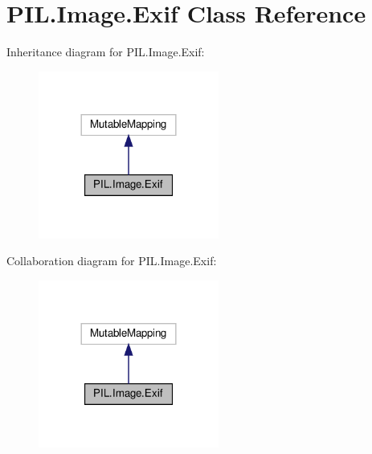 \hypertarget{classPIL_1_1Image_1_1Exif}{}\section{P\+I\+L.\+Image.\+Exif Class Reference}
\label{classPIL_1_1Image_1_1Exif}


Inheritance diagram for P\+I\+L.\+Image.\+Exif\+:
\nopagebreak
\begin{figure}[H]
\begin{center}
\leavevmode
\includegraphics[width=168pt]{classPIL_1_1Image_1_1Exif__inherit__graph}
\end{center}
\end{figure}


Collaboration diagram for P\+I\+L.\+Image.\+Exif\+:
\nopagebreak
\begin{figure}[H]
\begin{center}
\leavevmode
\includegraphics[width=168pt]{classPIL_1_1Image_1_1Exif__coll__graph}
\end{center}
\end{figure}
